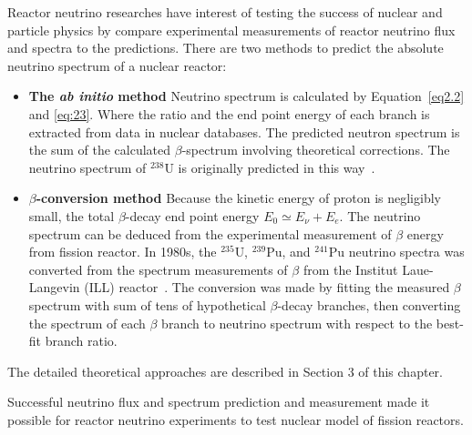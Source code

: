     Reactor neutrino researches have interest of testing the success of nuclear and particle physics by compare experimental measurements of reactor neutrino flux and spectra to the predictions.
    There are two methods to predict the absolute neutrino spectrum of a nuclear reactor:
    \begin{itemize}
        \item \textbf{The \textit{ab initio} method} Neutrino spectrum is calculated by Equation~\ref{eq2.2} and \ref{eq:23}. 
        Where the ratio and the end point energy of each branch is extracted from data in nuclear databases.
        The predicted neutron spectrum is the sum of the calculated $\beta$-spectrum involving theoretical corrections. 
        The neutrino spectrum of $^{238}$U is originally predicted in this way~\cite{bib:vogel}.
        \item \textbf{$\beta$-conversion method} Because the kinetic energy of proton is negligibly small, the total $\beta$-decay end point energy $E_0 \simeq E_\nu + E_e$.
        The neutrino spectrum can be deduced from the experimental measurement of $\beta$ energy from fission reactor. 
        In 1980s, the $^{235}$U, $^{239}$Pu, and $^{241}$Pu neutrino spectra was converted from the spectrum measurements of $\beta$ from the Institut Laue-Langevin (ILL) reactor~\cite{bib:ILL1982,bib:ILL1985,bib:ILL1989}.
        The conversion was made by fitting the measured $\beta$ spectrum with sum of tens of hypothetical $\beta$-decay branches, then converting the spectrum of each $\beta$ branch to neutrino spectrum with respect to the best-fit branch ratio.
    \end{itemize}
    The detailed theoretical approaches are described in Section 3 of this chapter. 
    
    Successful neutrino flux and spectrum prediction and measurement made it possible for reactor neutrino experiments to test nuclear model of fission reactors.


